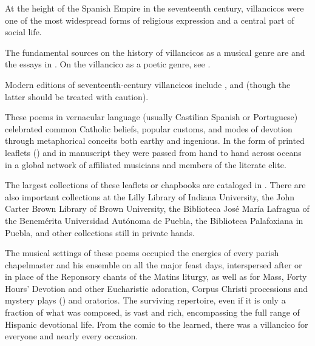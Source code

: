 
At the height of the Spanish Empire in the seventeenth century,
villancicos were one of the most widespread forms of religious expression and a central part of social life.%
  \begin{Footnote}
  The fundamental sources on the history of villancicos as a musical genre are \autocites{Laird:VC}{Rubio:Forma}{Torrente:PhD}{Illari:Polychoral} and the essays in \autocite{Knighton-Torrente:VCs}.
  On the villancico as a poetic genre, see \autocite{Tenorio:SorJuana}.

  Modern editions of seventeenth-century villancicos include \autocites{Ruimonte:Parnaso}{Fernandez:Cancionero}{RuizSamaniego:MME63}{Ezquerro:MME55}{Ezquerro:MME65}{Ezquerro:MME59}{Padilla:Tello}{Torrejon:VCs}, and \autocite{Stevenson:Christmas} (though the latter should be treated with caution).
  \end{Footnote}
These poems in vernacular language (usually Castilian Spanish or Portuguese) celebrated common Catholic beliefs, popular customs, and modes of devotion through metaphorical conceits both earthy and ingenious.
In the form of printed leaflets () and in manuscript they were passed from hand to hand across oceans in a global network of affiliated musicians and members of the literate elite.%
  \begin{Footnote}
  The largest collections of these leaflets or chapbooks are cataloged in \autocites{BNE:VCs17C}{BNE:VCs18C}{UK:VCs}{US:VCs}.
  There are also important collections at the Lilly Library of Indiana University, the John Carter Brown Library of Brown University, the Biblioteca José María Lafragua of the Benemérita Universidad Autónoma de Puebla, the Biblioteca Palafoxiana in Puebla, and other collections still in private hands.
  \end{Footnote}

The musical settings of these poems occupied the energies of every parish chapelmaster and his ensemble on all the major feast days, interspersed after or in place of the Reponsory chants of the Matins liturgy, as well as for Mass, Forty Hours' Devotion and other Eucharistic adoration, Corpus Christi processions and mystery plays () and oratorios.
The surviving repertoire, even if it is only a fraction of what was composed, is vast and rich, encompassing the full range of Hispanic devotional life.
From the comic to the learned, there was a villancico for everyone and nearly every occasion.

